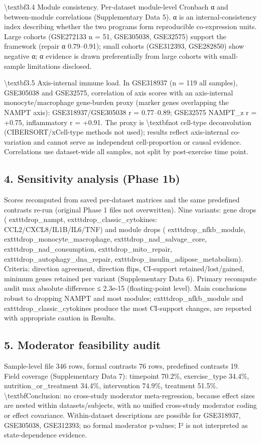 \documentclass[11pt]{article}
\begin{document}
\textbackslash{}textbf{3.4 Module consistency.} Per-dataset module-level Cronbach α and between-module correlations (Supplementary Data 5). α is an internal-consistency index describing whether the two programs form reproducible co-expression units. Large cohorts (GSE272133 n = 51, GSE305038, GSE32575) support the framework (repair α 0.79–0.91); small cohorts (GSE312393, GSE282850) show negative α; α evidence is drawn preferentially from large cohorts with small-sample limitations disclosed.

\textbackslash{}textbf{3.5 Axis-internal immune load.} In GSE318937 (n = 119 all samples), GSE305038 and GSE32575, correlation of axis scores with an axis-internal monocyte/macrophage gene-burden proxy (marker genes overlapping the NAMPT axis): GSE318937/GSE305038 r = 0.77–0.89; GSE32575 NAMPT\_z r = +0.75, inflammatory r = +0.91. The proxy is \textbackslash{}textbf{not} cell-type deconvolution (CIBERSORT/xCell-type methods not used); results reflect axis-internal co-variation and cannot serve as independent cell-proportion or causal evidence. Correlations use dataset-wide all samples, not split by post-exercise time point.

\subsection*{4. Sensitivity analysis (Phase 1b)}
Scores recomputed from saved per-dataset matrices and the same predefined contrasts re-run (original Phase 1 files not overwritten). Nine variants: gene drops (	exttt{drop\_nampt}, 	exttt{drop\_classic\_cytokines}: CCL2/CXCL8/IL1B/IL6/TNF) and module drops (	exttt{drop\_nfkb\_module}, 	exttt{drop\_monocyte\_macrophage}, 	exttt{drop\_nad\_salvage\_core}, 	exttt{drop\_nad\_consumption}, 	exttt{drop\_mito\_repair}, 	exttt{drop\_autophagy\_dna\_repair}, 	exttt{drop\_insulin\_adipose\_metabolism}). Criteria: direction agreement, direction flips, CI-support retained/lost/gained, minimum genes retained per variant (Supplementary Data 6). Primary recompute audit max absolute difference ≤ 2.3e-15 (floating-point level). Main conclusions robust to dropping NAMPT and most modules; 	exttt{drop\_nfkb\_module} and 	exttt{drop\_classic\_cytokines} produce the most CI-support changes, are reported with appropriate caution in Results.

\subsection*{5. Moderator feasibility audit}
Sample-level file 346 rows, formal contrasts 76 rows, predefined contrasts 19. Field coverage (Supplementary Data 7): timepoint 70.2\%, exercise\_type 34.4\%, nutrition\_or\_treatment 34.4\%, intervention 74.9\%, treatment 51.5\%. \textbackslash{}textbf{Conclusion: no cross-study moderator meta-regression}, because effect sizes are nested within datasets/subjects, with no unified cross-study moderator coding or effect covariance. Within-dataset descriptions are possible for GSE318937, GSE305038, GSE312393; no formal moderator p-values; I² is not interpreted as state-dependence evidence.
\end{document}
